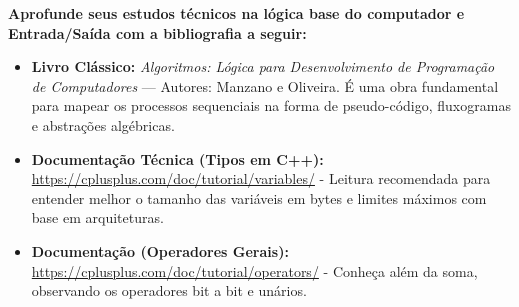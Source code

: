 \documentclass[11pt]{article}
\begin{document}
\begin{notebox}
\textbf{Aprofunde seus estudos técnicos na lógica base do computador e Entrada/Saída com a bibliografia a seguir:}
\begin{itemize}
    \item \textbf{Livro Clássico:} \textit{Algoritmos: Lógica para Desenvolvimento de Programação de Computadores} --- Autores: Manzano e Oliveira. É uma obra fundamental para mapear os processos sequenciais na forma de pseudo-código, fluxogramas e abstrações algébricas.
    \item \textbf{Documentação Técnica (Tipos em C++):} \url{https://cplusplus.com/doc/tutorial/variables/} - Leitura recomendada para entender melhor o tamanho das variáveis em bytes e limites máximos com base em arquiteturas.
    \item \textbf{Documentação (Operadores Gerais):} \url{https://cplusplus.com/doc/tutorial/operators/} - Conheça além da soma, observando os operadores bit a bit e unários.
\end{itemize}
\end{notebox}

\vspace{3cm}

\end{document}
